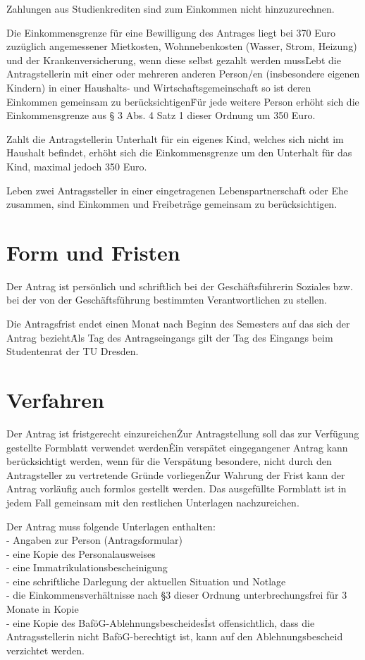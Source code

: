 \begin{multicols}{2}
\Abs \Satz Zahlungen aus Studienkrediten sind zum Einkommen nicht hinzuzurechnen.

\Abs \Satz Die Einkommensgrenze für eine Bewilligung des Antrages liegt bei 370 Euro zuzüglich angemessener Mietkosten, Wohnnebenkosten (Wasser, Strom, Heizung) und der Krankenversicherung, wenn diese selbst gezahlt werden muss\.
Lebt die Antragstellerin mit einer oder mehreren anderen Person/en (insbesondere eigenen Kindern) in einer Haushalts- und Wirtschaftsgemeinschaft so ist deren Einkommen gemeinsam zu berücksichtigen\. Für jede weitere Person erhöht sich die Einkommensgrenze aus § 3 Abs. 4 Satz 1 dieser Ordnung um 350 Euro.

\Abs \Satz Zahlt die Antragstellerin Unterhalt für ein eigenes Kind, welches sich nicht im Haushalt befindet, erhöht sich die Einkommensgrenze um den Unterhalt für das Kind, maximal jedoch 350 Euro.

\Abs \Satz Leben zwei Antragssteller in einer eingetragenen Lebenspartnerschaft oder Ehe zusammen, sind Einkommen und Freibeträge gemeinsam zu berücksichtigen.

\section{Form und Fristen}

\Abs \Satz Der Antrag ist persönlich und schriftlich bei der Geschäftsführerin Soziales bzw. bei der von der Geschäftsführung bestimmten Verantwortlichen zu stellen.

\Abs \Satz Die Antragsfrist endet einen Monat nach Beginn des Semesters auf das sich der Antrag bezieht\. Als Tag des Antragseingangs gilt der Tag des Eingangs beim Studentenrat der TU Dresden.


\section{Verfahren}

\Abs \Satz Der Antrag ist fristgerecht einzureichen\. Zur Antragstellung soll das zur Verfügung gestellte Formblatt verwendet werden\. Ein verspätet eingegangener Antrag kann berücksichtigt werden, wenn für die Verspätung besondere, nicht durch den Antragsteller zu vertretende Gründe vorliegen\. Zur Wahrung der Frist kann der Antrag vorläufig auch formlos gestellt werden. Das ausgefüllte Formblatt ist in jedem Fall gemeinsam mit den restlichen Unterlagen nachzureichen.

\Abs \Satz Der Antrag muss folgende Unterlagen enthalten: \\
- Angaben zur Person (Antragsformular) \\ - eine Kopie des Personalausweises \\ - eine Immatrikulationsbescheinigung \\ - eine schriftliche Darlegung der aktuellen Situation und Notlage \\ - die Einkommensverhältnisse nach §3 dieser Ordnung unterbrechungsfrei für 3 Monate in Kopie \\ - eine Kopie des BaföG-Ablehnungsbescheides\. 
Ist offensichtlich, dass die Antragsstellerin nicht BaföG-berechtigt ist, kann auf den Ablehnungsbescheid verzichtet werden.


\end{multicols}
